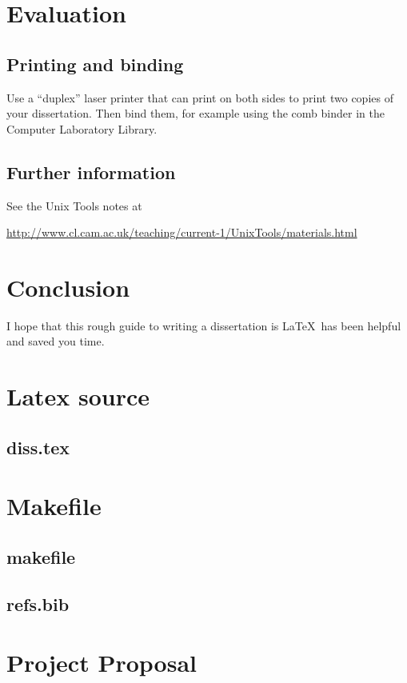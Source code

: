 \documentclass[12pt,a4paper,twoside,openright]{report}
\begin{document}
\chapter{Evaluation}

\section{Printing and binding}

Use a ``duplex'' laser printer that can print on both sides to print
two copies of your dissertation. Then bind them, for example using the
comb binder in the Computer Laboratory Library.

\section{Further information}

See the Unix Tools notes at

\url{http://www.cl.cam.ac.uk/teaching/current-1/UnixTools/materials.html}


\chapter{Conclusion}

I hope that this rough guide to writing a dissertation is \LaTeX\ has
been helpful and saved you time.




\appendix


\chapter{Latex source}

\section{diss.tex}
{\scriptsize}

\chapter{Makefile}

\section{makefile}\label{makefile}
{\scriptsize}

\section{refs.bib}
{\scriptsize}


\chapter{Project Proposal}


\end{document}
